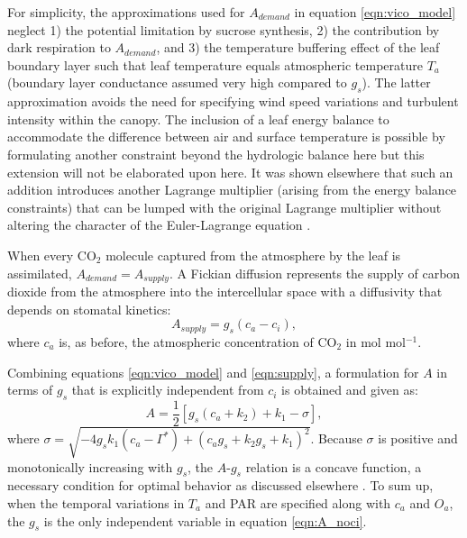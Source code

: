 \documentclass[utf8]{frontiersSCNS} %
\begin{document}
For simplicity, the approximations used for $A_{demand}$ in equation \ref{eqn:vico_model} neglect 1) the potential limitation by sucrose synthesis, 2) the contribution by dark respiration to $A_{demand}$, and 3) the temperature buffering effect of the leaf boundary layer such that leaf temperature equals atmospheric temperature $T_a$ (boundary layer conductance assumed very high compared to $g_s$).  The latter approximation avoids the need for specifying wind speed variations and turbulent intensity within the canopy.  The inclusion of a leaf energy balance to accommodate the difference between air and surface temperature is possible by formulating another constraint beyond the hydrologic balance here \citep{roth2018fossil} but this extension will not be elaborated upon here.  It was shown elsewhere that such an addition introduces another Lagrange multiplier (arising from the energy balance constraints) that can be lumped with the original Lagrange multiplier without altering the character of the Euler-Lagrange equation \citep{roth2018fossil}.

When every CO$_2$ molecule captured from the atmosphere by the leaf is assimilated, $A_{demand} = A_{supply}$. A Fickian diffusion represents the supply of carbon dioxide from the atmosphere into the intercellular space with a diffusivity that depends on stomatal kinetics:
\begin{equation}
    \label{eqn:supply}
    A_{supply} = g_s (c_a - c_i),
\end{equation}
where $c_a$ is, as before, the atmospheric concentration of CO$_2$ in mol mol$^{-1}$.

Combining equations \ref{eqn:vico_model} and \ref{eqn:supply}, a formulation for $A$ in terms of $g_s$ that is explicitly independent from $c_i$ is obtained and given as:
\begin{equation}
    \label{eqn:A_noci}
    A = \frac{1}{2} [g_s (c_a + k_2) + k_1 - \sigma],
\end{equation}
where $\sigma = \sqrt{-4 g_s k_1(c_a - \Gamma^*) + (c_a g_s + k_2 g_s + k_1)^2} $.  Because $\sigma$ is positive and monotonically increasing with $g_s$, the $A$-$g_s$ relation is a concave function, a necessary condition for optimal behavior as discussed elsewhere \citep{katul_stomatal_2009}. To sum up, when the temporal variations in $T_a$ and PAR are specified along with $c_a$ and $O_a$, the $g_s$ is the only independent variable in equation \ref{eqn:A_noci}.
\end{document}
